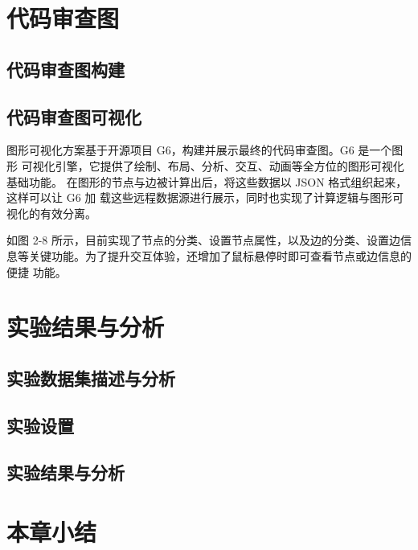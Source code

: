 \section{代码审查图}
\subsection{代码审查图构建}
\subsection{代码审查图可视化}

图形可视化方案基于开源项目 G6，构建并展示最终的代码审查图。G6 是一个图形
可视化引擎，它提供了绘制、布局、分析、交互、动画等全方位的图形可视化基础功能。
在图形的节点与边被计算出后，将这些数据以 JSON 格式组织起来，这样可以让 G6 加
载这些远程数据源进行展示，同时也实现了计算逻辑与图形可视化的有效分离。


如图 2-8 所示，目前实现了节点的分类、设置节点属性，以及边的分类、设置边信
息等关键功能。为了提升交互体验，还增加了鼠标悬停时即可查看节点或边信息的便捷
功能。

\section{实验结果与分析}

\subsection{实验数据集描述与分析}
\subsection{实验设置}
\subsection{实验结果与分析}

\section{本章小结}





